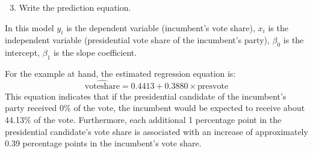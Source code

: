 \documentclass[
]{article}
\begin{document}
\begin{enumerate}\setcounter{enumi}{2}
	\item Write the prediction equation.
\end{enumerate}

\noindent In this model \(y_i\) is the dependent variable (incumbent's vote share), \(x_i\) is the independent variable (presidential vote share of the incumbent's party), \(\beta_0\) is the intercept, \(\beta_1\) is the slope coefficient.

\noindent For the example at hand, the estimated regression equation is:
\[
\widehat{\text{voteshare}} = 0.4413 + 0.3880 \times \text{presvote}
\]
This equation indicates that if the presidential candidate of the incumbent’s party received 0\% of the vote, the incumbent would be expected to receive about 44.13\% of the vote. Furthermore, each additional 1 percentage point in the presidential candidate’s vote share is associated with an increase of approximately 0.39 percentage points in the incumbent’s vote share.
\end{document}
